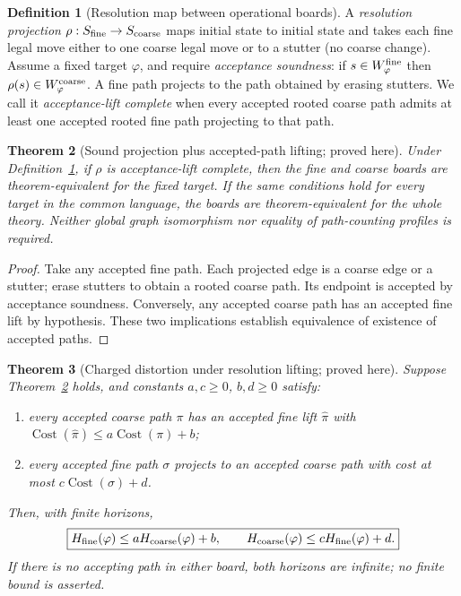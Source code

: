 \documentclass[11pt,letterpaper]{article}
\newtheorem{theorem}{Theorem}[section]
\theoremstyle{definition}
\newtheorem{definition}[theorem]{Definition}
\newcommand{\Cost}{\operatorname{Cost}}
\begin{document}
\begin{definition}[Resolution map between operational boards]\label{def:resolution}
A \emph{resolution projection} $\rho:S_{\rm fine}\to S_{\rm coarse}$ maps initial state to initial state and takes each fine legal move either to one coarse legal move or to a stutter (no coarse change). Assume a fixed target $\varphi$, and require \emph{acceptance soundness}: if $s\in W^{\rm fine}_\varphi$ then $\rho(s)\in W^{\rm coarse}_\varphi$. A fine path projects to the path obtained by erasing stutters. We call it \emph{acceptance-lift complete} when every accepted rooted coarse path admits at least one accepted rooted fine path projecting to that path.
\end{definition}
\begin{theorem}[Sound projection plus accepted-path lifting; proved here]\label{thm:lifting}
Under Definition~\ref{def:resolution}, if $\rho$ is acceptance-lift complete, then the fine and coarse boards are theorem-equivalent for the fixed target. If the same conditions hold for every target in the common language, the boards are theorem-equivalent for the whole theory. Neither global graph isomorphism nor equality of path-counting profiles is required.
\end{theorem}
\begin{proof}
Take any accepted fine path. Each projected edge is a coarse edge or a stutter; erase stutters to obtain a rooted coarse path. Its endpoint is accepted by acceptance soundness. Conversely, any accepted coarse path has an accepted fine lift by hypothesis. These two implications establish equivalence of existence of accepted paths.
\end{proof}
\begin{theorem}[Charged distortion under resolution lifting; proved here]\label{thm:distort}
Suppose Theorem~\ref{thm:lifting} holds, and constants $a,c\ge0$, $b,d\ge0$ satisfy:
\begin{enumerate}[label=(\roman*),leftmargin=*]
\item every accepted coarse path $\pi$ has an accepted fine lift $\widehat\pi$ with $\Cost(\widehat\pi)\le a\Cost(\pi)+b$;
\item every accepted fine path $\sigma$ projects to an accepted coarse path with cost at most $c\Cost(\sigma)+d$.
\end{enumerate}
Then, with finite horizons,
\[
\boxed{H_{\rm fine}(\varphi)\le aH_{\rm coarse}(\varphi)+b,
\qquad H_{\rm coarse}(\varphi)\le cH_{\rm fine}(\varphi)+d.}
\]
If there is no accepting path in either board, both horizons are infinite; no finite bound is asserted.
\end{theorem}
\end{document}
